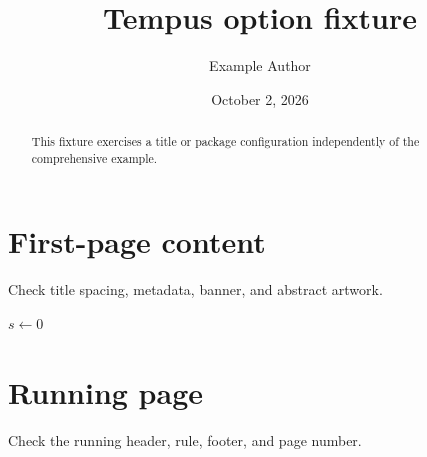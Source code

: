 \documentclass[algorithms]{tempusreport}
\title{Tempus option fixture}
\author{Example Author}
\date{October 2, 2026}
\begin{document}
\maketitle
\begin{abstract}This fixture exercises a title or package configuration independently of the comprehensive example.\end{abstract}
\section{First-page content}
Check title spacing, metadata, banner, and abstract artwork.
\begin{algorithm}\caption{Fixture algorithm}\begin{algorithmic}[1]\State $s\gets0$\end{algorithmic}\end{algorithm}
\clearpage\section{Running page}
Check the running header, rule, footer, and page number.
\end{document}
